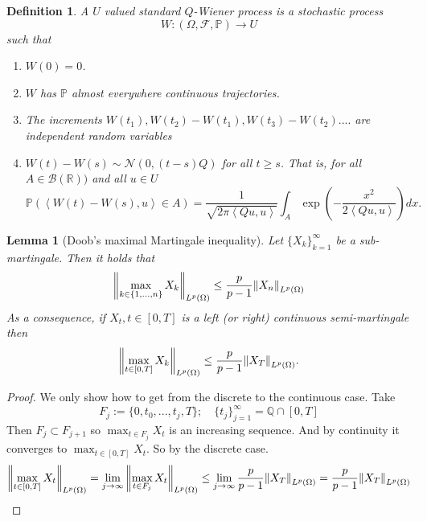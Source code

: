 \documentclass[12pt]{article}
\newcommand{\br}[1]{\left\langle#1\right\rangle}
\newcommand{\R}{{\mathbb R}}
\newcommand{\PP}{{\mathbb P}}
\newtheorem{lemma}{Lemma}
\newtheorem{definition}{Definition}
\begin{document}
\begin{definition}
	A $U$ valued standard $Q$-Wiener process is a stochastic process
	\begin{equation*}
		W:(\Omega,\mathcal{F},\mathbb{P})\to U
	\end{equation*}
	such that
	\begin{enumerate}
		\item $W(0)=0$.
		\item $W$ has $\PP$ almost everywhere continuous trajectories.
		\item The increments $W(t_1),W(t_2)-W(t_1),W(t_3)-W(t_2)....$ are independent random variables
		\item $W(t)-W(s)\sim \mathcal{N}(0,(t-s)Q)$ for all $t\geq s$. That is, for all $A\in\mathcal{B}(\R))$ and all $u\in U$
		      \begin{equation*}
			      \mathbb{P}(\br{W(t)-W(s),u}\in A)=\frac{1}{\sqrt{2\pi\br{Qu,u}}}\int_A\exp(-\frac{x^2}{2\br{Qu,u}})dx.
		      \end{equation*}
	\end{enumerate}
\end{definition}
\begin{lemma}[Doob's maximal Martingale inequality]
	Let $\{X_k\}_{k=1}^\infty$ be a sub-martingale. Then it holds that
	\begin{equation*}
		\norm{\max_{k\in\{1,...,n\}}X_k}_{L^p(\Omega)}\leq \frac{p}{p-1}\norm{X_n}_{L^p(\Omega)}
	\end{equation*}
	As a consequence, if $X_t,t\in[0,T]$ is a left (or right) continuous semi-martingale then
	\begin{equation*}
		\norm{\max_{t\in[0,T]}X_k}_{L^p(\Omega)}\leq \frac{p}{p-1}\norm{X_T}_{L^p(\Omega)}.
	\end{equation*}
\end{lemma}
\begin{proof}
	We only show how to get from the discrete to the continuous case. Take
	\begin{equation*}
		F_j:= \{0,t_0,...,t_j,T\}; \quad \{t_j\}_{j=1}^\infty =\mathbb{Q}\cap [0,T]
	\end{equation*}
	Then $F_j\subset F_{j+1}$ so $\max_{t\in F_j}X_t$ is an increasing sequence. And by continuity it converges to $\max_{t\in[0,T]}X_t$. So by the discrete case.
	\begin{equation*}
		\norm{\max_{t\in[0,T]}X_t}_{L^p(\Omega)}=\lim_{j\to\infty}\norm{\max_{t\in F_j}X_t}_{L^p(\Omega)}\leq \lim_{j\to\infty}\frac{p}{p-1}\norm{X_T}_{L^p(\Omega)}=\frac{p}{p-1}\norm{X_T}_{L^p(\Omega)}
	\end{equation*}
\end{proof}
\end{document}

